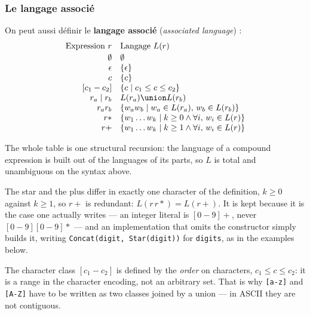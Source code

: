 \subsubsection{Le langage associé}
\begin{definition}
  On peut aussi définir le \textbf{langage associé} (\textit{associated
  language}) :
  \[
    \begin{array}{r@{\quad}l}
      \text{Expression } r & \text{Langage } L(r) \\[2pt]
      \emptyset    & \emptyset \\
      \epsilon     & \{\epsilon\} \\
      c            & \{c\} \\
      {}[c_1 - c_2]  & \{ c \mid c_1 \le c \le c_2 \} \\
      r_a \mid r_b & L(r_a) \union L(r_b) \\
      r_a r_b      & \{ w_a w_b \mid w_a \in L(r_a),\, w_b \in L(r_b) \} \\
      r{*}         & \{ w_1 \ldots w_k \mid k \ge 0 \wedge \forall i,\, w_i \in L(r) \} \\
      r{+}         & \{ w_1 \ldots w_k \mid k \ge 1 \wedge \forall i,\, w_i \in L(r) \}
    \end{array}
  \]
\end{definition}

The whole table is one structural recursion: the language of a compound
expression is built out of the languages of its parts, so $L$ is total and
unambiguous on the syntax above.

\begin{remark}
  The star and the plus differ in exactly one character of the definition,
  $k \ge 0$ against $k \ge 1$, so $r{+}$ is redundant: $L(r\,r{*}) = L(r{+})$.
  It is kept because it is the case one actually writes --- an integer literal
  is $[0-9]{+}$, never $[0-9][0-9]{*}$ --- and an implementation that omits
  the constructor simply builds it, writing \texttt{Concat(digit, Star(digit))}
  for \texttt{digits}, as in the examples below.
\end{remark}

\begin{remark}
  The character class $[c_1 - c_2]$ is defined by the \emph{order} on
  characters, $c_1 \le c \le c_2$: it is a range in the character encoding, not
  an arbitrary set. That is why \texttt{[a-z]} and \texttt{[A-Z]} have to be
  written as two classes joined by a union --- in ASCII they are not contiguous.
\end{remark}

